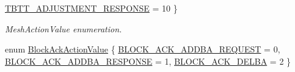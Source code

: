 \begin{DoxyCompactItemize}
\hyperlink{classns3_1_1WifiActionHeader_a7dec260ba924574c5abb38c1d8a562b1a47d16ede15f09d2d61404bedec729ae3}{T\+B\+T\+T\+\_\+\+A\+D\+J\+U\+S\+T\+M\+E\+N\+T\+\_\+\+R\+E\+S\+P\+O\+N\+SE} = 10
 \}\begin{DoxyCompactList}\small\item\em Mesh\+Action\+Value enumeration. \end{DoxyCompactList}
\item 
enum \hyperlink{classns3_1_1WifiActionHeader_a575d216d28074b8e5fc25d17692f6962}{Block\+Ack\+Action\+Value} \{ \hyperlink{classns3_1_1WifiActionHeader_a575d216d28074b8e5fc25d17692f6962aae76baa0c4e02e79e3d69f7d926cc27d}{B\+L\+O\+C\+K\+\_\+\+A\+C\+K\+\_\+\+A\+D\+D\+B\+A\+\_\+\+R\+E\+Q\+U\+E\+ST} = 0, 
\hyperlink{classns3_1_1WifiActionHeader_a575d216d28074b8e5fc25d17692f6962ac3751303132994172def72465dba6db3}{B\+L\+O\+C\+K\+\_\+\+A\+C\+K\+\_\+\+A\+D\+D\+B\+A\+\_\+\+R\+E\+S\+P\+O\+N\+SE} = 1, 
\hyperlink{classns3_1_1WifiActionHeader_a575d216d28074b8e5fc25d17692f6962a31c45aded50eec5db8f12da960e3d239}{B\+L\+O\+C\+K\+\_\+\+A\+C\+K\+\_\+\+D\+E\+L\+BA} = 2
 \}
\end{DoxyCompactItemize}
